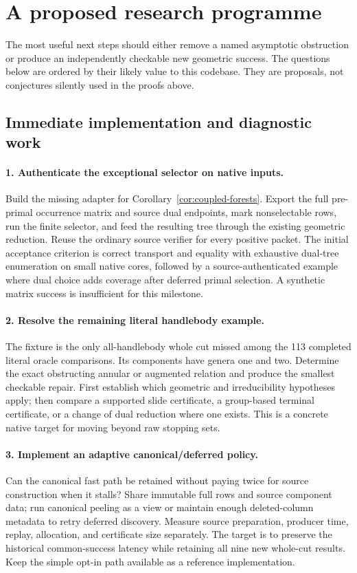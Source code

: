 \section{A proposed research programme}
\label{sec:research}

The most useful next steps should either remove a named asymptotic
obstruction or produce an independently checkable new geometric success.
The questions below are ordered by their likely value to this codebase.
They are proposals, not conjectures silently used in the proofs above.

\subsection{Immediate implementation and diagnostic work}

\paragraph{1. Authenticate the exceptional selector on native inputs.}
Build the missing adapter for Corollary~\ref{cor:coupled-forests}.  Export
the full pre-primal occurrence matrix and source dual endpoints, mark
nonselectable rows, run the finite selector, and feed the resulting tree
through the existing geometric reduction.  Reuse the ordinary source
verifier for every positive packet.  The initial acceptance criterion is
correct transport and equality with exhaustive dual-tree enumeration on
small native cores, followed by a source-authenticated example where
dual choice adds coverage after deferred primal selection.  A synthetic
matrix success is insufficient for this milestone.

\paragraph{2. Resolve the remaining literal handlebody example.}
The fixture  is the only all-handlebody
whole cut missed among the 113 completed literal oracle comparisons.
Its components have genera one and two.  Determine the exact obstructing
annular or augmented relation and produce the smallest checkable repair.
First establish which geometric and irreducibility hypotheses apply;
then compare a supported slide certificate, a group-based terminal
certificate, or a change of dual reduction where one exists.  This is a
concrete native target for moving beyond raw stopping sets.

\paragraph{3. Implement an adaptive canonical/deferred policy.}
Can the canonical fast path be retained without paying twice for source
construction when it stalls?  Share immutable full rows and source
component data; run canonical peeling as a view or maintain enough
deleted-column metadata to retry deferred discovery.  Measure source
preparation, producer time, replay, allocation, and certificate size
separately.  The target is to preserve the historical common-success
latency while retaining all nine new whole-cut results.  Keep the simple
opt-in path available as a reference implementation.

